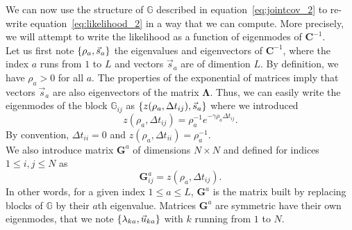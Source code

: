 \documentclass[preprint,amsmath,amssymb,superscriptaddress,showpacs,pre]{revtex4-1}
\let\originalleft\left
\let\originalright\right
\renewcommand{\left}{\mathopen{}\mathclose\bgroup\originalleft}
\renewcommand{\right}{\aftergroup\egroup\originalright}
\newcommand{\Lam}{\bm{\Lambda}}
\newcommand{\iC}{\bm{C}^{-1}}
\newcommand{\vsa}{\vec{s}_a}
\newcommand{\vuka}{\vec{u}_{ka}}
\begin{document}
We can now use the structure of $\mathbb{G}$ described in equation~\ref{eq:jointcov_2} to re-write equation~\ref{eq:likelihood_2} in a way that we can compute. 
More precisely, we will attempt to write the likelihood as a function of eigenmodes of $\iC$. \\
Let us first note $\left\{\rho_a, \vsa\right\}$ the eigenvalues and eigenvectors of $\iC$, where the index $a$ runs from $1$ to $L$ and vectors $\vsa$ are of dimention $L$. 
By definition, we have $\rho_a>0$ for all $a$.  
The properties of the exponential of matrices imply that vectors $\vsa$ are also eigenvectors of the matrix $\Lam$. 
Thus, we can easily write the eigenmodes of the block $\mathbb{G}_{ij}$ as $\left\{z(\rho_a, \Delta t_{ij}), \vsa\right\}$ where we introduced
\begin{equation}
	z(\rho_a, \Delta t_{ij}) = \rho_a^{-1}e^{-\gamma\rho_a\Delta t_{ij}}.
	\label{eq:z}
\end{equation}
By convention, $\Delta t_{ii} = 0$ and $z(\rho_a, \Delta t_{ii}) = \rho_a^{-1}$. \\
We also introduce matrix $\mathbf{G}^a$ of dimensions $N\times N$ and defined for indices $1\leq i,j\leq N$ as 
\begin{equation}
	\mathbf{G}^a_{ij} = z(\rho_a, \Delta t_{ij}). 
	\label{eq:subG_def}
\end{equation}
In other words, for a given index $1\leq a\leq L$, $\mathbf{G}^a$ is the matrix built by replacing blocks of $\mathbb{G}$ by their $a$th eigenvalue.
Matrices $\mathbf{G}^a$ are symmetric have their own eigenmodes, that we note $\left\{\lambda_{ka}, \vuka\right\}$ with $k$ running from $1$ to $N$.
\end{document}
